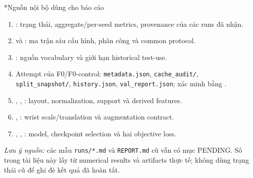 \documentclass[10pt,a4paper]{article}
\makeatletter
\renewcommand\section{\@startsection{section}{1}{\z@}{-2.1ex plus -.5ex minus -.2ex}{1.0ex plus .2ex}{\normalfont\large\bfseries\color{ink}}}
\newcommand{\code}[1]{\texttt{#1}}
\makeatother
\begin{document}
\section*{Nguồn nội bộ dùng cho báo cáo}
{\small
\begin{enumerate}
\item {}: trạng thái, aggregate/per-seed metrics, provenance của các runs đã nhận.
\item {} và : ma trận sáu cấu hình, phân công và common protocol.
\item {}: nguồn vocabulary và giới hạn historical test-use.
\item Attempt của F0/F0-control: \code{metadata.json}, \code{cache\_audit/}, \code{split\_snapshot/}, \code{history.json}, \code{val\_report.json}; xác minh bằng .
\item {}, , : layout, normalization, support và derived features.
\item {}, : wrist scale/translation và augmentation contract.
\item {}, , : model, checkpoint selection và hai objective loss.
\end{enumerate}}
\textit{Lưu ý nguồn:} các mẫu \code{runs/*.md} và \code{REPORT.md} cũ vẫn có mục PENDING. Số trong tài liệu này lấy từ numerical results và artifacts thực tế; không dùng trạng thái cũ để ghi đè kết quả đã hoàn tất.
\end{document}
